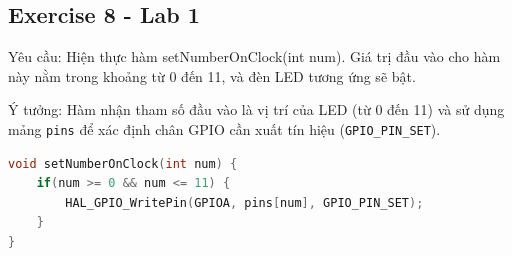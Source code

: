\subsection{Exercise 8 - Lab 1}

Yêu cầu: Hiện thực hàm setNumberOnClock(int num). Giá trị đầu vào cho hàm này nằm trong khoảng từ 0 đến 11, và đèn LED tương ứng sẽ bật.

Ý tưởng: Hàm nhận tham số đầu vào là vị trí của LED (từ 0 đến 11) và sử dụng mảng \texttt{pins} để xác định chân GPIO cần xuất tín hiệu  (\texttt{GPIO\_PIN\_SET}).

\begin{lstlisting}[language=C, caption={Hàm setNumberOnClock}, label={lst:set_number_on_clock}]
void setNumberOnClock(int num) {
    if(num >= 0 && num <= 11) {
        HAL_GPIO_WritePin(GPIOA, pins[num], GPIO_PIN_SET);
    }
}
\end{lstlisting}